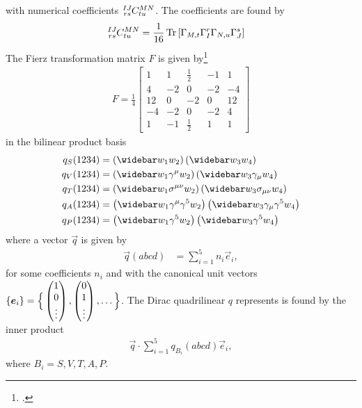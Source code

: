 \documentclass[english,notitlepage]{article}
\begin{document}
    with numerical coefficients \(\tensor*[^{IJ}_{rs}]{C}{^{MN}_{tu}}\). The coefficients are found by
    \begin{align}
        \tensor*[^{IJ}_{rs}]{C}{^{MN}_{tu}} & = \frac{1}{16} \tr\bclosed{\Gamma_{M,t} \Gamma_I^r \Gamma_{N,u} \Gamma_J^{s}}
    \end{align}
    The Fierz transformation matrix \(F\) is given by\footcite{Nieves:2003in}
    \begin{align}
        F = \frac{1}{4}
        \begin{bmatrix}
            1  & 1  & \frac{1}{2} & -1 & 1  \\
            4  & -2 & 0           & -2 & -4 \\
            12 & 0  & -2          & 0  & 12 \\
            -4 & -2 & 0           & -2 & 4  \\
            1  & -1 & \frac{1}{2} & 1  & 1
        \end{bmatrix}
    \end{align}
    in the bilinear product basis
    \begin{subequations}
        \begin{align}
            q_S(1234) & = \pclosed{\wbar{w}_1 w_2} \pclosed{\wbar{w}_3 w_4}                                         \\
            q_V(1234) & = \pclosed{\wbar{w}_1 \gamma^\mu w_2} \pclosed{\wbar{w}_3 \gamma_\mu w_4}                   \\
            q_T(1234) & = \pclosed{\wbar{w}_1 \sigma^{\mu\nu} w_2} \pclosed{\wbar{w}_3 \sigma_{\mu\nu} w_4}         \\
            q_A(1234) & = \pclosed{\wbar{w}_1 \gamma^\mu \gamma^5 w_2} \pclosed{\wbar{w}_3 \gamma_\mu \gamma^5 w_4} \\
            q_P(1234) & = \pclosed{\wbar{w}_1 \gamma^5 w_2} \pclosed{\wbar{w}_3 \gamma^5 w_4}                       \\
        \end{align}
    \end{subequations}
    where a vector \(\vec{q}\) is given by
    \begin{align}
        \vec{q}(abcd) & = \sum_{i=1}^5 n_i \vec{e}_i,
    \end{align}
    for some coefficients \(n_i\) and with the canonical unit vectors \(\left\{\boldsymbol{e}_i\right\} = \Big\{\begin{pmatrix} 1\\0\\\vdots \end{pmatrix}, \begin{pmatrix} 0\\1\\\vdots \end{pmatrix}, \ldots \Big\}\).
    The Dirac quadrilinear \(q\) represents is found by the inner product
    \begin{align}
        \vec{q} \cdot \sum_{i=1}^5 q_{B_i}(abcd) \vec{e}_i,
    \end{align}
    where \(B_i = S, V, T, A, P\).
\end{document}
